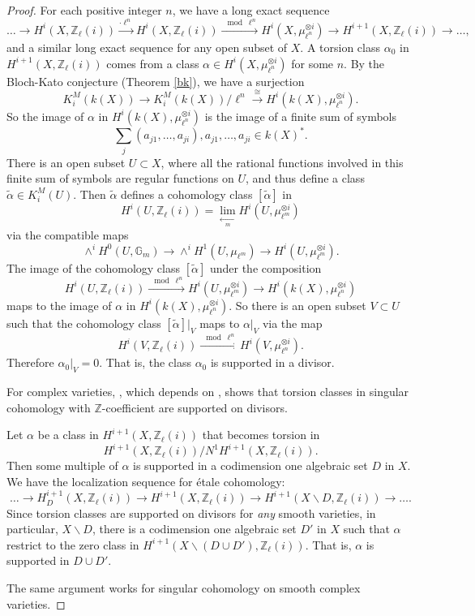 \documentclass{amsart}
\theoremstyle{definition}
\theoremstyle{remark}
\newcommand{\mbb}{\mathbb}
\newcommand{\ZZ}{\mbb{Z}}
\begin{document}
\begin{proof}
    For each positive integer $n$, we have a long exact sequence
    \[
    \ldots \to H^i(X, \ZZ_\ell(i))\xrightarrow{\cdot \ell^n} H^i(X, \ZZ_\ell(i))\xrightarrow{\mod \ell^n} H^i(X, \mu_{\ell^n}^{\otimes i})\to H^{i+1}(X, \ZZ_\ell(i)) \to \ldots,
    \]
    and a similar long exact sequence for any open subset of $X$.
    A torsion class $\alpha_0$ in $H^{i+1}(X, \ZZ_\ell(i))$ comes from a class $\alpha \in H^i(X, \mu_{\ell^n}^{\otimes i})$ for some $n$.
    By the Bloch-Kato conjecture (Theorem \ref{bk}), we have a surjection
    \[
    K_i^M(k(X)) \to K_i^M(k(X))/\ell^n \xrightarrow{\cong} H^{i}(k(X), \mu_{\ell^n}^{\otimes i}).
    \]
    So the image of $\alpha$ in $H^{i}(k(X), \mu_{\ell^n}^{\otimes i})$
     is the image of a finite sum of symbols
     \[
     \sum_j (a_{j1}, \ldots, a_{ji}), a_{j1}, \ldots, a_{ji} \in k(X)^*.
     \]
     There is an open subset $U\subset X$, where all the rational functions involved in this finite sum of symbols are regular functions on $U$, and thus define a class $\tilde{\alpha} \in K_i^M(U)$.
     Then  $\tilde{\alpha}$ defines a cohomology class $[\tilde{\alpha}]$ in
    \[
    H^i(U, \ZZ_\ell(i))=\lim \limits_{\xleftarrow[m]{}}H^i(U, \mu_{\ell^m}^{\otimes i})
    \]
    via the compatible maps $$\wedge^i H^0(U, \mathbb{G}_m) \to \wedge^i H^1(U, \mu_{\ell^m})\to H^i(U, \mu_{\ell^m}^{\otimes i}).$$
    The image of the cohomology class $[\tilde{\alpha}]$ under the composition 
    \[
    H^i(U, \ZZ_\ell(i)) \xrightarrow{\mod \ell^n} H^i(U, \mu_{\ell^m}^{\otimes i}) \to H^i(k(X), \mu_{\ell^n}^{\otimes i})\]
     maps to the image of $\alpha$ in $H^i(k(X), \mu_{\ell^n}^{\otimes i})$.
    So there is an open subset $V\subset U$ such that the cohomology class $[\tilde{\alpha}]|_V$ 
     maps to $\alpha|_V$ via the map
    \[
    H^i(V, \ZZ_\ell(i)) \xrightarrow{\mod \ell^n} H^i(V, \mu_{\ell^n}^{\otimes i}).
    \]
    Therefore $\alpha_0|_V=0$.
    That is, the class $\alpha_0$ is supported in a divisor.

    For complex varieties, \cite[Proposition 2.8]{BO_Coniveau}, which depends on \cite[Th\'eor\`eme 3.1]{CTVoisin}, shows that torsion classes in singular cohomology with $\ZZ$-coefficient are supported on divisors.

     Let $\alpha$ be a class in $H^{i+1}(X, \ZZ_\ell(i))$ that becomes torsion in $$H^{i+1}(X, \ZZ_\ell(i))/N^1H^{i+1}(X, \ZZ_\ell(i)).$$ Then some multiple of $\alpha$ is supported in a codimension one algebraic set $D$ in $X$. We have the localization sequence for \'etale cohomology:
    \[
    \ldots \to H^{i+1}_D(X, \ZZ_\ell(i)) \to H^{i+1}(X, \ZZ_\ell(i)) \to H^{i+1}(X\backslash D, \ZZ_\ell(i)) \to \ldots.
    \]
    Since torsion classes are supported on divisors for \emph{any} smooth varieties, in particular, $X\backslash D$,  there is a codimension one algebraic set $D'$ in $X$ such that $\alpha$ restrict to the zero class in $H^{i+1}(X\backslash (D\cup D'), \ZZ_\ell(i))$. That is, $\alpha$ is supported in $D\cup D'$.

    The same argument works for singular cohomology on smooth complex varieties.
\end{proof}
\end{document}
